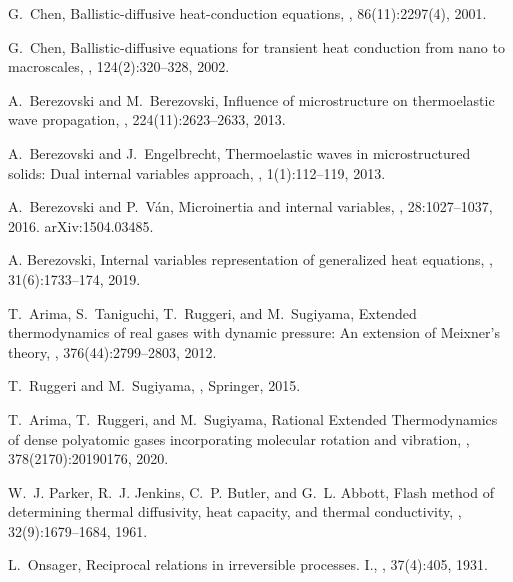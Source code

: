 \documentclass[sn-mathphys]{sn-jnl}%
\theoremstyle{thmstyleone}%
\theoremstyle{thmstyletwo}%
\theoremstyle{thmstylethree}%
\begin{document}
\begin{thebibliography}{9}
	G.~Chen,
	\newblock Ballistic-diffusive heat-conduction equations,
	, 86(11):2297(4), 2001.
	
	G.~Chen,
	\newblock Ballistic-diffusive equations for transient heat conduction from nano
	to macroscales,
	, 124(2):320--328, 2002.
	
	A.~Berezovski and M.~Berezovski,
	\newblock Influence of microstructure on thermoelastic wave propagation,
	, 224(11):2623--2633, 2013.
	
	A.~Berezovski and J.~Engelbrecht,
	\newblock Thermoelastic waves in microstructured solids: Dual internal
	variables approach,
	,
	1(1):112--119, 2013.
	
	A.~Berezovski and P.~V\'an,
	\newblock Microinertia and internal variables,
	, 28:1027--1037, 2016.
	\newblock arXiv:1504.03485.
	
	A. Berezovski,
	\newblock Internal variables representation of generalized heat equations,
	, 31(6):1733--174, 2019.
	
	T.~Arima, S.~Taniguchi, T.~Ruggeri, and M.~Sugiyama,
	\newblock Extended thermodynamics of real gases with dynamic pressure: {A}n
	extension of {M}eixner's theory,
	, 376(44):2799--2803, 2012.
	
	T.~Ruggeri and M.~Sugiyama,
	,
	\newblock Springer, 2015.
	
	T.~Arima, T.~Ruggeri, and M.~Sugiyama,
	\newblock Rational {E}xtended {T}hermodynamics of dense polyatomic gases
	incorporating molecular rotation and vibration,
	,
	378(2170):20190176, 2020.
	
	W.~J. Parker, R.~J. Jenkins, C.~P. Butler, and G.~L. Abbott,
	\newblock Flash method of determining thermal diffusivity, heat capacity, and
	thermal conductivity,
	, 32(9):1679--1684, 1961.
	
	L.~Onsager,
	\newblock Reciprocal relations in irreversible processes. {I}.,
	, 37(4):405, 1931.
	

\end{thebibliography}
\end{document}
